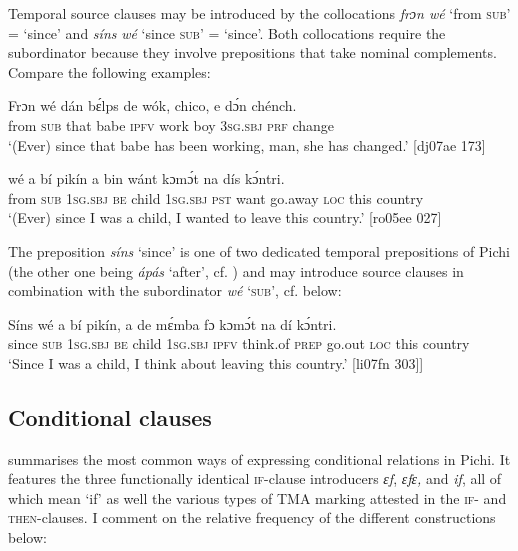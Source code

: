 Temporal source clauses may be introduced by the collocations \textit{frɔn wé} ‘from \textsc{sub’} = ‘since’ and \textit{síns} \textit{wé} ‘since \textsc{sub’} = ‘since’. Both collocations require the subordinator because they involve prepositions that take nominal complements. Compare the following examples:


\ea%
    \label{ex:key:1517}
    \gll Frɔn  wé  dán  bɛ́lps  de  wók,  chico,  e    dɔ́n  chénch.\\
from  \textsc{sub}  that  babe  \textsc{ipfv}  work  boy    \textsc{3sg.sbj}  \textsc{prf}  change\\

\glt ‘(Ever) since that babe has been working, man, she has changed.’ [dj07ae 173]
\z


\ea%
    \label{ex:key:1518}
    \gll {}    wé  a  bí  pikín  a    bin  wánt  kɔmɔ́t
na  dís  kɔ́ntri.\\
from  \textsc{sub}  \textsc{1sg.sbj}  \textsc{be}  child  \textsc{1sg.sbj}  \textsc{pst}  want  go.away
\textsc{loc}  this  country\\

\glt ‘(Ever) since I was a child, I wanted to leave this country.’ [ro05ee 027]
\z

The preposition \textit{síns} ‘since’ is one of two dedicated temporal prepositions of Pichi (the other one being \textit{ápás} ‘after’, cf. ) and may introduce source clauses in combination with the subordinator \textit{wé} ‘\textsc{sub’,} cf.  below:


\ea%
    \label{ex:key:1519}
    \gll Síns    wé  a    bí  pikín,  a    de  mɛ́mba  fɔ
kɔmɔ́t  na  dí  kɔ́ntri.\\
since  \textsc{sub}  \textsc{1sg.sbj}  \textsc{be}  child  \textsc{1sg.sbj}  \textsc{ipfv}  think.of  \textsc{prep}
go.out  \textsc{loc}  this  country\\

\glt ‘Since I was a child, I think about leaving this country.’ [li07fn 303]]
\z

\subsection{Conditional clauses}\label{sec:10.7.11}
 summarises the most common ways of expressing conditional relations in Pichi. It features the three functionally identical \textsc{if-}clause introducers \textit{ɛf}, \textit{ɛfɛ,} and \textit{if}, all of which mean ‘if’ as well the various types of TMA marking attested in the \textsc{if-} and \textsc{then-}clauses. I comment on the relative frequency of the different constructions below:

